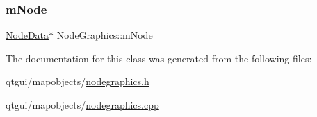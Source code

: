 \mbox{\label{class_node_graphics_a3387ce3d275b95478d9e6d88218bfc78}} 
\subsubsection{\texorpdfstring{mNode}{mNode}}
{\footnotesize\ttfamily \mbox{\hyperlink{class_node_data}{Node\+Data}}$\ast$ Node\+Graphics\+::m\+Node\hspace{0.3cm}{\ttfamily [protected]}}



The documentation for this class was generated from the following files\+:\begin{DoxyCompactItemize}
\item 
qtgui/mapobjects/\mbox{\hyperlink{nodegraphics_8h}{nodegraphics.\+h}}\item 
qtgui/mapobjects/\mbox{\hyperlink{nodegraphics_8cpp}{nodegraphics.\+cpp}}\end{DoxyCompactItemize}
